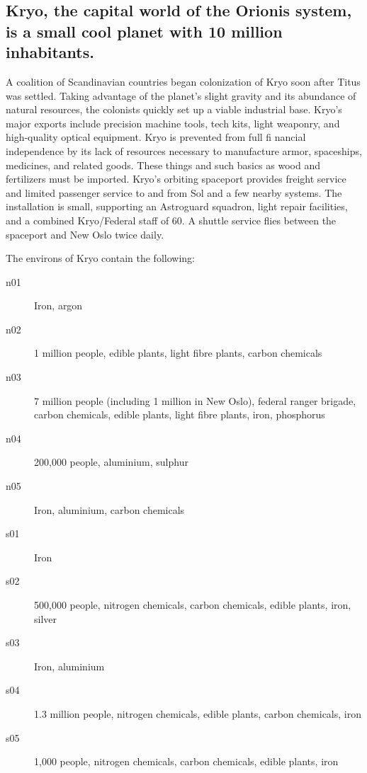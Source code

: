 \begin{figure}[htbp]
  \centering
\end{figure}

\subsection[Kyro]{Kryo, the capital world of the Orionis system, is a
  small cool planet 
with 10 million inhabitants.}
\label{sec:kryo-capital-world}

A coalition of Scandinavian countries began colonization of Kryo soon
after Titus was settled. Taking advantage of the planet's slight
gravity and its abundance of natural resources, the colonists quickly
set up a viable industrial base. Kryo's major exports include
precision machine tools, tech kits, light weaponry, and high-quality
optical equipment. Kryo is prevented from full fi nancial independence
by its lack of resources necessary to manufacture armor, spaceships,
medicines, and related goods. These things and such basics as wood and
fertilizers must be imported. Kryo's orbiting spaceport provides
freight service and limited passenger service to and from Sol and a
few nearby systems. The installation is small, supporting an
Astroguard squadron, light repair facilities, and a combined
Kryo/Federal staff of 60. A shuttle service flies between the
spaceport and New Oslo twice daily.

The environs of Kryo contain the following: 

\begin{description}
\item[n01] Iron, argon
\item[n02] 1 million people, edible plants, light fibre plants, carbon
  chemicals
\item[n03] 7 million people (including 1 million in New Oslo), federal
  ranger brigade, carbon chemicals, edible plants, light fibre plants,
  iron, phosphorus
\item[n04] 200,000 people, aluminium, sulphur
\item[n05] Iron, aluminium, carbon chemicals
\item[s01] Iron
\item[s02] 500,000 people, nitrogen chemicals, carbon chemicals,
  edible plants, iron, silver
\item[s03] Iron, aluminium 
\item[s04] 1.3 million people, nitrogen chemicals, edible plants,
  carbon chemicals, iron
\item[s05] 1,000 people, nitrogen chemicals, carbon chemicals, edible plants, iron 
\end{description}


